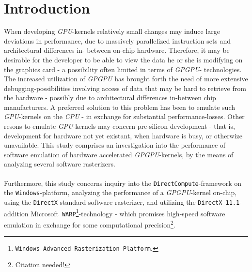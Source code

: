 \documentclass[fleqn,10pt]{SelfArx} %
\affiliation{EricNNilsson@gmail.com}
\newlength{\tocsep}
\begin{document}
\flushbottom %
\maketitle %
\thispagestyle{empty} %

\section*{Introduction} %
\label{sec:introduction}
When developing \textit{GPU}-kernels relatively small changes may induce large deviations in performance, due to massively parallelized instruction sets and architectural differences in-
between on-chip hardware. Therefore, it may be desirable for the developer to be able to view the data he or she is modifying on the graphics card - a possibility often limited in terms of \textit{GPGPU}-
technologies.\\
The increased utilization of \textit{GPGPU} has brought forth the need of more extensive debugging-possibilities involving access of data that may be hard to retrieve from the hardware - possibly due to architectural differences in-between chip manufacturers. A preferred solution to this problem has been to emulate such \textit{GPU}-kernels on the \textit{CPU} - in exchange for substantial performance-losses. Other resons to emulate \textit{GPU}-kernels may concern pre-silicon development - that is, development for hardware not yet existant, when hardware is busy, or otherwize unavailable. This study comprises an investigation into the performance of software emulation of hardware accelerated \textit{GPGPU}-kernels, by the means of analyzing several software rasterizers.\\
\\
Furthermore, this study concerns inquiry into the \texttt{DirectCompute}-framework on the \texttt{Windows}-platform, analyzing the performance of a \textit{GPGPU}-kernel on-chip, using the \texttt{DirectX} standard software rasterizer, and utilizing the \texttt{DirectX~11.1}-addition Microsoft~\texttt{WARP}\footnote{\texttt{Windows~Advanced~Rasterization~Platform}.}-technology - which promises high-speed software emulation in exchange for some computational precision\footnote{Citation needed!}. \\
\end{document}
